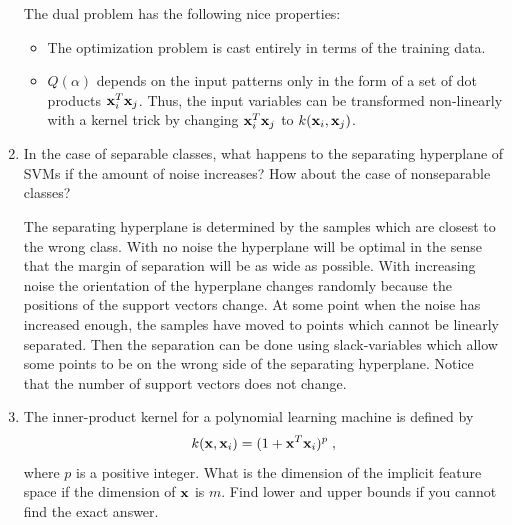 \begin{enumerate}
\begin{solution}
    The dual problem has the following nice properties:
    \begin{itemize}
    \item The optimization problem is cast entirely in terms of the
      training data.
    \item $Q(\alpha)$ depends on the input patterns only in the form
      of a set of dot products $\mathbf{x}_i^T\mathbf{x}_j$.  Thus, the input
      variables can be transformed non-linearly with a kernel trick by
      changing $\mathbf{x}_i^T\mathbf{x}_j$ to $k(\mathbf{x}_i,\mathbf{x}_j)$.
    \end{itemize}
    


  \end{solution}
  
\item In the case of separable classes, what happens to the separating
  hyperplane of SVMs if the amount of noise increases? How about the
  case of nonseparable classes?

  \begin{solution}

    The separating hyperplane is determined by the samples which are
    closest to the wrong class.  With no noise the hyperplane will be
    optimal in the sense that the margin of separation will be as wide
    as possible.  With increasing noise the orientation of the
    hyperplane changes randomly because the positions of the support
    vectors change.  At some point when the noise has increased enough,
    the samples have moved to points which cannot be linearly separated.
    Then the separation can be done using slack-variables which allow
    some points to be on the wrong side of the separating hyperplane.
    Notice that the number of support vectors does not change.

    
  \end{solution}
  
\item The inner-product kernel for a polynomial learning machine is
  defined by
  \begin{displaymath}
    k(\mathbf{x},\mathbf{x}_i) = (1 + \mathbf{x}^T \mathbf{x}_i)^p \; ,
  \end{displaymath}
  where $p$ is a positive integer.  What is the dimension of the
  implicit feature space if the dimension of $\mathbf{x}$ is $m$.  Find lower
  and upper bounds if you cannot find the exact answer.


\end{enumerate}
